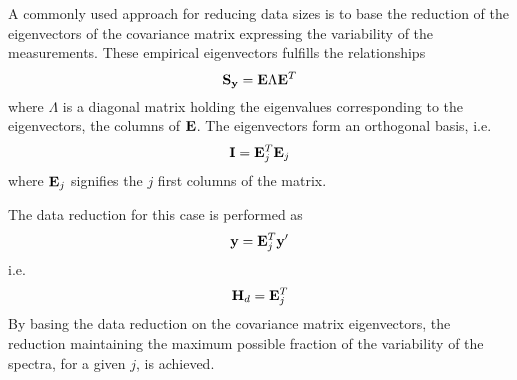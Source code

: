  \label{sec:red:eig}
 
 A commonly used approach for reducing data sizes is to base the
 reduction of the eigenvectors of the covariance matrix expressing the
 variability of the measurements. These empirical eigenvectors
 fulfills the relationships
 \begin{equation}
   \mathbf{S}_{\mathbf{y}} = \mathbf{E}\Lambda\mathbf{E}^T
 \end{equation}
 where $\Lambda$ is a diagonal matrix holding the eigenvalues
 corresponding to the eigenvectors, the columns of $\mathbf{E}$. The
 eigenvectors form an orthogonal basis, i.e.
 \begin{equation}
   \mathbf{I} = \mathbf{E}^T_j\mathbf{E}_j
 \end{equation}
 where $\mathbf{E}_j$ signifies the $j$ first columns of the matrix.

 The data reduction for this case is performed as
 \begin{equation}
   \mathbf{y} = \mathbf{E}^T_j \mathbf{y}'
 \end{equation}
 i.e.
 \begin{equation}
   \mathbf{H}_d = \mathbf{E}^T_j 
 \end{equation}
 By basing the data reduction on the covariance matrix eigenvectors,
 the reduction maintaining the maximum possible fraction of the
 variability of the spectra, for a given $j$, is achieved.






